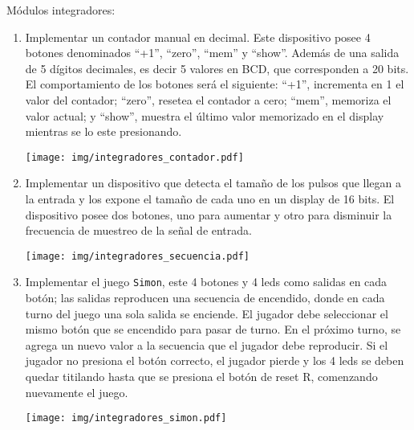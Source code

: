 \documentclass[a4paper,11pt]{article}
\begin{document}
\begin{exercise}%
\noindent Módulos integradores:
\begin{enumerate}
\item Implementar un contador manual en decimal. Este dispositivo posee 4 botones denominados ``+1'', ``zero'', ``mem'' y ``show''. Además de una salida de 5 dígitos decimales, es decir 5 valores en BCD, que corresponden a 20 bits.
El comportamiento de los botones será el siguiente: ``+1'', incrementa en 1 el valor del contador; ``zero'', resetea el contador a cero; ``mem'', memoriza el valor actual; y ``show'', muestra el último valor memorizado en el display mientras se lo este presionando.
\begin{center}
\texttt{[image: img/integradores\_contador.pdf]}
\end{center}
\item Implementar un dispositivo que detecta el tamaño de los pulsos que llegan a la entrada y los expone el tamaño de cada uno en un display de 16 bits.
El dispositivo posee dos botones, uno para aumentar y otro para disminuir la frecuencia de muestreo de la señal de entrada.
\begin{center}
\texttt{[image: img/integradores\_secuencia.pdf]}
\end{center}
\item Implementar el juego \texttt{Simon}, este 4 botones y 4 leds como salidas en cada botón; las salidas reproducen una secuencia de encendido, donde en cada turno del juego una sola salida se enciende. El jugador debe seleccionar el mismo botón que se encendido para pasar de turno. En el próximo turno, se agrega un nuevo valor a la secuencia que el jugador debe reproducir. Si el jugador no presiona el botón correcto, el jugador pierde y los 4 leds se deben quedar titilando hasta que se presiona el botón de reset R, comenzando nuevamente el juego.
\begin{center}
\texttt{[image: img/integradores\_simon.pdf]}
\end{center}
\end{enumerate}
\end{exercise}
\end{document}
